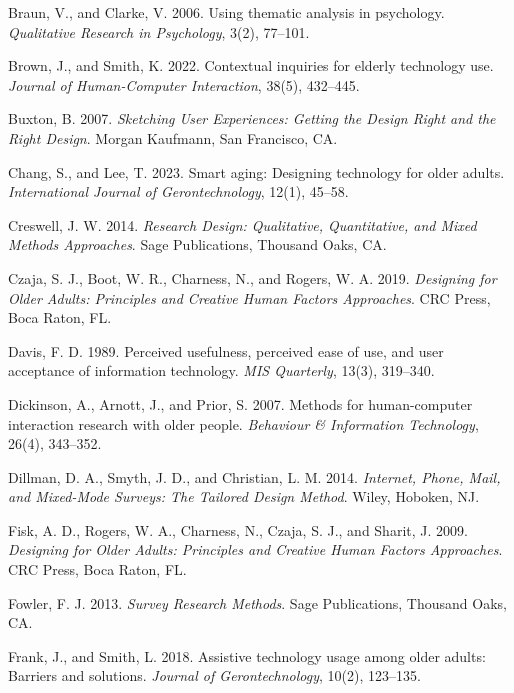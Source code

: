 \documentclass[acmlarge]{acmart}
\begin{document}
{\begin{thebibliography}{50}
Braun, V., and Clarke, V. 2006. Using thematic analysis in psychology. \textit{Qualitative Research in Psychology}, 3(2), 77--101.

Brown, J., and Smith, K. 2022. Contextual inquiries for elderly technology use. \textit{Journal of Human-Computer Interaction}, 38(5), 432--445.

Buxton, B. 2007. \textit{Sketching User Experiences: Getting the Design Right and the Right Design}. Morgan Kaufmann, San Francisco, CA.

Chang, S., and Lee, T. 2023. Smart aging: Designing technology for older adults. \textit{International Journal of Gerontechnology}, 12(1), 45--58.

Creswell, J. W. 2014. \textit{Research Design: Qualitative, Quantitative, and Mixed Methods Approaches}. Sage Publications, Thousand Oaks, CA.

Czaja, S. J., Boot, W. R., Charness, N., and Rogers, W. A. 2019. \textit{Designing for Older Adults: Principles and Creative Human Factors Approaches}. CRC Press, Boca Raton, FL.

Davis, F. D. 1989. Perceived usefulness, perceived ease of use, and user acceptance of information technology. \textit{MIS Quarterly}, 13(3), 319--340.

Dickinson, A., Arnott, J., and Prior, S. 2007. Methods for human-computer interaction research with older people. \textit{Behaviour \& Information Technology}, 26(4), 343--352.

Dillman, D. A., Smyth, J. D., and Christian, L. M. 2014. \textit{Internet, Phone, Mail, and Mixed-Mode Surveys: The Tailored Design Method}. Wiley, Hoboken, NJ.

Fisk, A. D., Rogers, W. A., Charness, N., Czaja, S. J., and Sharit, J. 2009. \textit{Designing for Older Adults: Principles and Creative Human Factors Approaches}. CRC Press, Boca Raton, FL.

Fowler, F. J. 2013. \textit{Survey Research Methods}. Sage Publications, Thousand Oaks, CA.

Frank, J., and Smith, L. 2018. Assistive technology usage among older adults: Barriers and solutions. \textit{Journal of Gerontechnology}, 10(2), 123--135.


\end{thebibliography}}
\end{document}
